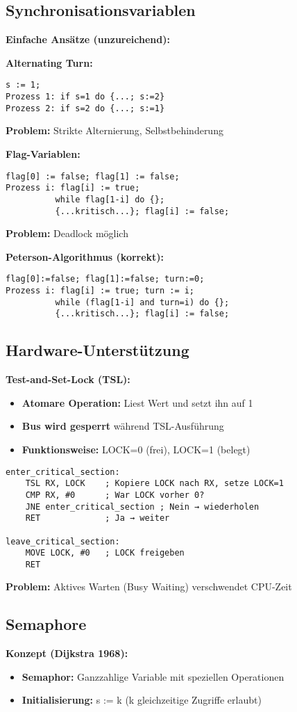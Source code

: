 \documentclass[9pt,a4paper]{extarticle}
\begin{document}
\begin{multicols*}{2}
\subsection{Synchronisationsvariablen}
\textbf{Einfache Ansätze (unzureichend):}

\textbf{Alternating Turn:}
\begin{verbatim}
s := 1;
Prozess 1: if s=1 do {...; s:=2}
Prozess 2: if s=2 do {...; s:=1}
\end{verbatim}
\textbf{Problem:} Strikte Alternierung, Selbstbehinderung

\textbf{Flag-Variablen:}
\begin{verbatim}
flag[0] := false; flag[1] := false;
Prozess i: flag[i] := true;
          while flag[1-i] do {};
          {...kritisch...}; flag[i] := false;
\end{verbatim}
\textbf{Problem:} Deadlock möglich

\textbf{Peterson-Algorithmus (korrekt):}
\begin{verbatim}
flag[0]:=false; flag[1]:=false; turn:=0;
Prozess i: flag[i] := true; turn := i;
          while (flag[1-i] and turn=i) do {};
          {...kritisch...}; flag[i] := false;
\end{verbatim}

\subsection{Hardware-Unterstützung}
\textbf{Test-and-Set-Lock (TSL):}
\begin{itemize}
\item \textbf{Atomare Operation:} Liest Wert und setzt ihn auf 1
\item \textbf{Bus wird gesperrt} während TSL-Ausführung
\item \textbf{Funktionsweise:} LOCK=0 (frei), LOCK=1 (belegt)
\end{itemize}

\begin{verbatim}
enter_critical_section:
    TSL RX, LOCK    ; Kopiere LOCK nach RX, setze LOCK=1
    CMP RX, #0      ; War LOCK vorher 0?
    JNE enter_critical_section ; Nein → wiederholen
    RET             ; Ja → weiter

leave_critical_section:
    MOVE LOCK, #0   ; LOCK freigeben
    RET
\end{verbatim}

\textbf{Problem:} Aktives Warten (Busy Waiting) verschwendet CPU-Zeit

\subsection{Semaphore}
\textbf{Konzept (Dijkstra 1968):}
\begin{itemize}
\item \textbf{Semaphor:} Ganzzahlige Variable mit speziellen Operationen
\item \textbf{Initialisierung:} s := k (k gleichzeitige Zugriffe erlaubt)
\end{itemize}


\end{multicols*}
\end{document}
